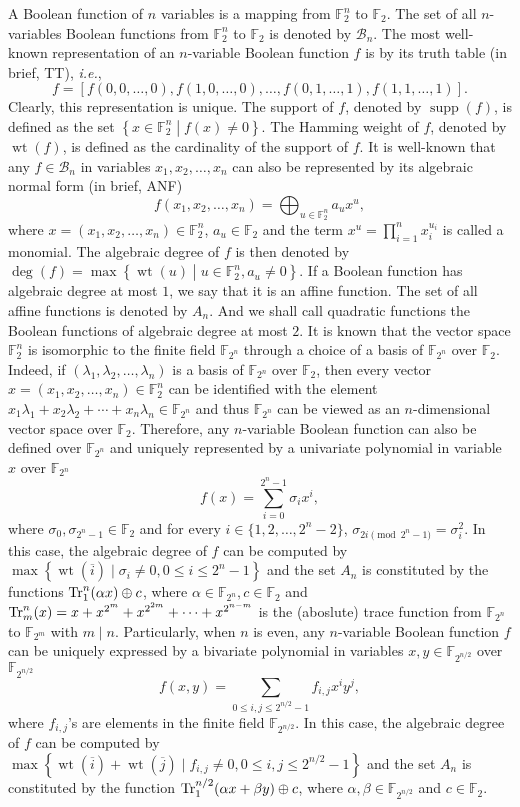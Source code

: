 \documentclass{article}
\newcommand{\F}{\mathbb{F}}
\newcommand{\0}{\textbf{0}}
\newcommand{\1}{\textbf{1}}
\newcommand{\wt}{\operatorname{wt}}
\theoremstyle{plain}
\begin{document}
    A Boolean function of $n$ variables is a mapping from $\F_2^n$ to $\F_2$. 
    The set of all $n$-variables Boolean functions from $\F_2^n$ to $\F_2$ is denoted by $\mathcal{B}_n$. 
    The most well-known representation of an $n$-variable Boolean function $f$ is by its truth table (in brief, TT), \emph{i.e.}, 
    \[f=\left[ f(0,0,\dots,0),f(1,0,\dots,0),\dots,f(0,1,\dots,1),f(1,1,\dots,1) \right].\]
    Clearly, this representation is unique.
    The support of $f$, denoted by $\operatorname{supp}(f)$, is defined as the set $\left\{ x\in\F_2^n\middle|f(x)\ne 0 \right\}$. 
    The Hamming weight of $f$, denoted by $\wt(f)$, is defined as the cardinality of the support of $f$. 
    It is well-known that any $f\in\mathcal{B}_n$ in variables $x_1,x_2,\dots,x_n$ can also be represented by its algebraic normal form (in brief, ANF)
    \[f(x_1,x_2,\dots,x_n) = \bigoplus_{u\in\F_2^n}a_ux^u,\]
    where $x=(x_1,x_2,\dots,x_n)\in\F_2^n$, $a_u\in\F_2$ and the term $x^{u}=\prod_{i=1}^nx_i^{u_i}$ is called a monomial.
    The algebraic degree of $f$ is then denoted by $\deg(f)=\max\left\{ \wt(u)\middle| u\in\F_2^n, a_u\ne 0 \right\}$. 
    If a Boolean function has algebraic degree at most $1$, we say that it is an affine function. 
    The set of all affine functions is denoted by $A_n$. 
    And we shall call quadratic functions the Boolean functions of algebraic degree at most $2$. 
    It is known that the vector space $\F_2^n$ is isomorphic to the finite field $\F_{2^n}$ through a choice of a basis of $\F_{2^n}$ over $\F_2$. 
    Indeed, if $(\lambda_1,\lambda_2,\dots,\lambda_n)$ is a basis of $\F_{2^n}$ over $\F_2$, then every vector $x=(x_1,x_2,\dots,x_n)\in\F_2^n$ can be
    identified with the element $x_1\lambda_1+x_2\lambda_2+\cdots+x_n\lambda_n\in\F_{2^n}$ and thus $\F_{2^n}$ can be viewed as an $n$-dimensional vector space over $\F_2$. 
    Therefore, any $n$-variable Boolean function can also be defined over $\F_{2^n}$ and uniquely represented by a univariate polynomial in variable $x$ over $\F_{2^n}$
    \[f(x) = \sum_{i=0}^{2^n-1}\sigma_ix^i,\] 
    where $\sigma_0,\sigma_{2^n-1}\in\F_2$ and for every $i\in\{1,2,\dots,2^n-2\}$, $\sigma_{2i\pmod{2^n-1}}=\sigma_i^2$. 
    In this case, the algebraic degree of $f$ can be computed by $\max\left\{ \wt(\overline{i})\mid \sigma_i\ne 0, 0\le i\le 2^n-1 \right\}$ and the set $A_n$ is constituted by the functions $\Tr_1^n(\alpha x)\oplus c$, where $\alpha\in\F_{2^n}, c\in\F_2$ and $ \Tr_m^n(x)=x+x^{2^m}+x^{2^{2m}}+\cdots+x^{2^{n-m}}$ is the (aboslute) trace function from $\F_{2^n}$ to $\F_{2^m}$ with $m\mid n$. 
    Particularly, when $n$ is even, any $n$-variable Boolean function $f$ can be uniquely expressed by a bivariate polynomial in variables $x,y\in\F_{2^{n/2}}$ over $\F_{2^{n/2}}$
    \[f(x,y)=\sum_{0\le i,j\le 2^{n/2}-1}f_{i,j}x^iy^j,\]
    where $f_{i,j}$'s are elements in the finite field $\F_{2^{n/2}}$. 
    In this case, the algebraic degree of $f$ can be computed by $\max\left\{ \wt(\overline{i})+\wt(\overline{j})\mid f_{i,j}\ne 0, 0\le i,j\le 2^{n/2}-1 \right\}$ and the set $A_n$ is constituted by the function $\Tr_1^{n/2}(\alpha x+\beta y)\oplus c$, where $\alpha,\beta\in\F_{2^{n/2}}$ and $c\in\F_2$. 
\end{document}
